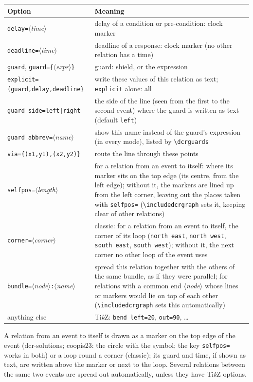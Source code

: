 \documentclass[a4paper,11pt]{article}
\newcommand\cs[1]{\texttt{\textbackslash#1}}
\newcommand\key[1]{\texttt{#1}}
\newcommand\meta[1]{\ensuremath{\langle}\textit{#1}\ensuremath{\rangle}}
\begin{document}
\medskip
\begin{tabularx}{\linewidth}{@{}lL@{}}
\toprule
Option & Meaning\\
\midrule
\key{delay=}\meta{time} & delay of a condition or pre-condition: clock marker\\
\key{deadline=}\meta{time} & deadline of a response: clock marker (no other
  relation has a time)\\
\key{guard}, \key{guard=\{}\meta{expr}\key{\}} & guard: shield, or the expression\\
\key{explicit=\{guard,delay,deadline\}} & write these values of this relation as
  text; \key{explicit} alone: all\\
\key{guard side=left|right} & the side of the line (seen from the first to
  the second event) where the guard is written as text (default
  \key{left})\\
\key{guard abbrev=}\meta{name} & show this name instead of the guard's
  expression (in every mode), listed by \cs{dcrguards}\\
\key{via=\{(x1,y1),(x2,y2)\}} & route the line through these points\\
\key{selfpos=}\meta{length} & for a relation from an event to itself: where its
  marker sits on the top edge (its centre, from the left edge); without it,
  the markers are lined up from the left corner, leaving out the places
  taken with \key{selfpos=} (\cs{includedcrgraph} sets it, keeping clear of
  other relations)\\
\key{corner=}\meta{corner} & classic: for a relation from an event
  to itself, the corner of its loop (\key{north east}, \key{north west},
  \key{south east}, \key{south west}); without it, the next corner no other
  loop of the event uses\\
\key{bundle=}\meta{node}\key{:}\meta{name} & spread this relation together with
  the others of the same bundle, as if they were parallel; for relations
  with a common end \meta{node} whose lines or markers would lie on top of
  each other (\cs{includedcrgraph} sets this automatically)\\
anything else & Ti\emph{k}Z: \key{bend left=20}, \key{out=90}, \dots\\
\bottomrule
\end{tabularx}

\medskip\noindent
A relation from an event to itself is drawn as a marker on the top edge
of the event (dcr-solutions; coopis23: the circle with the symbol; the
key \key{selfpos=} works in both) or a loop round a corner (classic); its
guard and time, if shown as text, are written above the marker or next to
the loop. Several relations between the same two events
are spread out automatically, unless they have Ti\emph{k}Z options.
\end{document}
